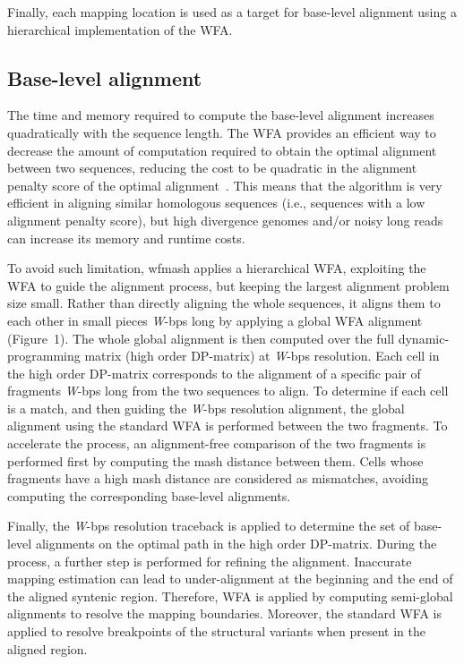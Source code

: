 \documentclass{bioinfo}
\begin{document}
Finally, each mapping location is used as a target for base-level alignment using a hierarchical implementation
of the WFA.

\subsection{Base-level alignment}
The time and memory required to compute the base-level alignment increases quadratically with the sequence length.
The WFA provides an efficient way to decrease the amount of computation required to obtain the optimal alignment between two sequences,
reducing the cost to be quadratic in the alignment penalty score of the optimal alignment~\citep{32915952}.
This means that the algorithm is very efficient in aligning similar homologous sequences (i.e., sequences with a
low alignment penalty score), but high divergence genomes and/or noisy long reads can increase its memory and runtime costs.

To avoid such limitation, wfmash applies a hierarchical WFA, exploiting the WFA to guide the alignment process, but keeping the largest alignment problem size small.
Rather than directly aligning the whole sequences, it aligns them to each other in small pieces \textit{W}-bps long by applying a global WFA alignment (Figure~1\vphantom{\ref{fig:1}}).
The whole global alignment is then computed over the full dynamic-programming matrix (high order DP-matrix) at \textit{W}-bps resolution.
Each cell in the high order DP-matrix corresponds to the alignment of a specific pair of fragments \textit{W}-bps long from the two sequences to align.
To determine if each cell is a match, and then guiding the \textit{W}-bps resolution alignment, the global alignment using the standard WFA is performed between the two fragments.
To accelerate the process, an alignment-free comparison of the two fragments is performed first by computing the mash distance between them.
Cells whose fragments have a high mash distance are considered as mismatches, avoiding computing the corresponding base-level alignments.

Finally, the \textit{W}-bps resolution traceback is applied to determine the set of base-level alignments on the optimal path in the high order DP-matrix.
During the process, a further step is performed for refining the alignment.
Inaccurate mapping estimation can lead to under-alignment at the beginning and the end of the aligned syntenic region.
Therefore, WFA is applied by computing semi-global alignments to resolve the mapping boundaries.
Moreover, the standard WFA is applied to resolve breakpoints of the structural variants when present in the aligned region.
\end{document}

